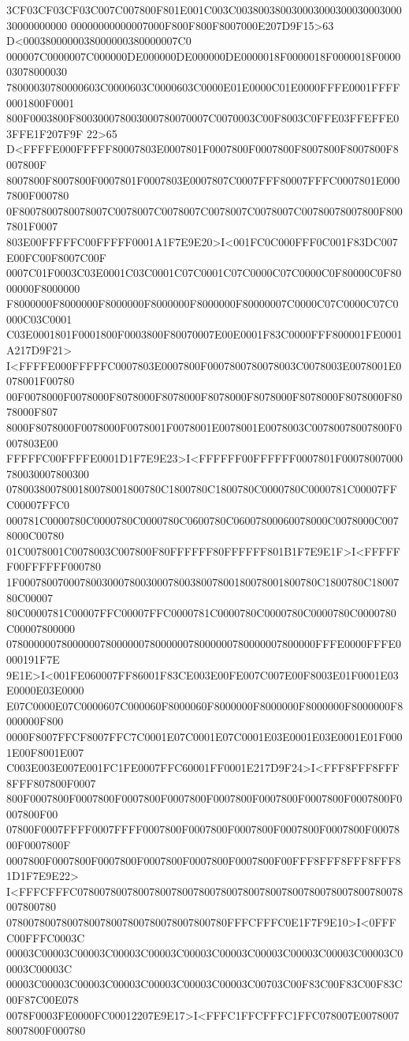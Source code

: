 3CF03CF03CF03C007C007800F801E001C003C00380038003000300030003000300030000000000
00000000000007000F800F800F8007000E207D9F15>63 D<0003800000038000000380000007C0
000007C0000007C000000DE000000DE000000DE0000018F0000018F0000018F000003078000030
78000030780000603C0000603C0000603C0000E01E0000C01E0000FFFE0001FFFF0001800F0001
800F0003800F800300078003000780070007C0070003C00F8003C0FFE03FFEFFE03FFE1F207F9F
22>65 D<FFFFE000FFFFF80007803E0007801F0007800F0007800F8007800F8007800F8007800F
8007800F8007800F0007801F0007803E0007807C0007FFF80007FFFC0007801E0007800F000780
0F8007800780078007C0078007C0078007C0078007C0078007C00780078007800F8007801F0007
803E00FFFFFC00FFFFF0001A1F7E9E20>I<001FC0C000FFF0C001F83DC007E00FC00F8007C00F
0007C01F0003C03E0001C03C0001C07C0001C07C0000C07C0000C0F80000C0F8000000F8000000
F8000000F8000000F8000000F8000000F8000000F80000007C0000C07C0000C07C0000C03C0001
C03E0001801F0001800F0003800F80070007E00E0001F83C0000FFF800001FE0001A217D9F21>
I<FFFFE000FFFFFC0007803E0007800F0007800780078003C0078003E0078001E0078001F00780
00F0078000F0078000F8078000F8078000F8078000F8078000F8078000F8078000F8078000F807
8000F8078000F0078000F0078001F0078001E0078001E0078003C00780078007800F0007803E00
FFFFFC00FFFFE0001D1F7E9E23>I<FFFFFF00FFFFFF0007801F00078007000780030007800300
0780038007800180078001800780C1800780C1800780C0000780C0000781C00007FFC00007FFC0
000781C0000780C0000780C0000780C0600780C06007800060078000C0078000C0078000C00780
01C0078001C0078003C007800F80FFFFFF80FFFFFF801B1F7E9E1F>I<FFFFFF00FFFFFF000780
1F000780070007800300078003000780038007800180078001800780C1800780C1800780C00007
80C0000781C00007FFC00007FFC0000781C0000780C0000780C0000780C0000780C00007800000
07800000078000000780000007800000078000000780000007800000FFFE0000FFFE0000191F7E
9E1E>I<001FE060007FF86001F83CE003E00FE007C007E00F8003E01F0001E03E0000E03E0000
E07C0000E07C0000607C000060F8000060F8000000F8000000F8000000F8000000F8000000F800
0000F8007FFCF8007FFC7C0001E07C0001E07C0001E03E0001E03E0001E01F0001E00F8001E007
C003E003E007E001FC1FE0007FFC60001FF0001E217D9F24>I<FFF8FFF8FFF8FFF807800F0007
800F0007800F0007800F0007800F0007800F0007800F0007800F0007800F0007800F0007800F00
07800F0007FFFF0007FFFF0007800F0007800F0007800F0007800F0007800F0007800F0007800F
0007800F0007800F0007800F0007800F0007800F0007800F00FFF8FFF8FFF8FFF81D1F7E9E22>
I<FFFCFFFC07800780078007800780078007800780078007800780078007800780078007800780
0780078007800780078007800780078007800780FFFCFFFC0E1F7F9E10>I<0FFFC00FFFC0003C
00003C00003C00003C00003C00003C00003C00003C00003C00003C00003C00003C00003C00003C
00003C00003C00003C00003C00003C00003C00003C00703C00F83C00F83C00F83C00F87C00E078
0078F0003FE0000FC00012207E9E17>I<FFFC1FFCFFFC1FFC078007E00780078007800F000780
